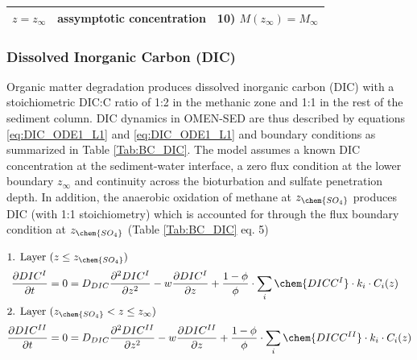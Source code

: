 \documentclass[gmd, manuscript]{copernicus}
\begin{document}
\begin{table}[tbp]
\begin{tabular}{ |l| l| l|}
$z=z_{\infty}$& assymptotic concentration & 10) $M(z_\infty)=M_\infty$\\
\hline    
\end{tabular}
\label{Tab:BC_PO4+M}
\end{table}

\subsubsection{Dissolved Inorganic Carbon (DIC)}
Organic matter degradation produces dissolved inorganic carbon (DIC) with a stoichiometric DIC:C ratio of 1:2 in the methanic zone and 1:1 in the rest of the sediment column. 
DIC dynamics in OMEN-SED are thus described by equations \ref{eq:DIC_ODE1_L1} and \ref{eq:DIC_ODE1_L1} and boundary conditions as summarized in Table \ref{Tab:BC_DIC}. 
The model assumes a known DIC concentration at the sediment-water interface, a zero flux condition at the lower boundary $z_\infty$ and continuity across the bioturbation and sulfate penetration depth. 
In addition, the anaerobic oxidation of methane at $z_{\chem{SO_4}}$ produces DIC (with 1:1 stoichiometry) which is accounted for through the flux boundary condition 
at $z_{\chem{SO_4}}$ (Table \ref{Tab:BC_DIC} eq. 5)

\begin{align}
\intertext{1. Layer ($z \leq z_{\chem{SO_4}}$)}
  \frac{\partial DIC^I}{\partial t} &= 0 = D_{DIC} \frac{\partial^2DIC^I }{\partial z^2} - w\frac{\partial DIC^I }{\partial z} + \frac{1-\phi}{\phi} \cdot \sum_i \chem{DICC^I} \cdot k_i \cdot C_{i}(z)\label{eq:DIC_ODE1_L1}\\ %
 \intertext{2. Layer ($z_{\chem{SO_4}} < z \leq z_\infty$)} 
  \frac{\partial DIC^{II}}{\partial t} &= 0 = D_{DIC} \frac{\partial^2DIC^{II} }{\partial z^2} - w\frac{\partial DIC^{II} }{\partial z} + \frac{1-\phi}{\phi} \cdot \sum_i \chem{DICC^{II}} \cdot k_i \cdot C_{i}(z)\label{eq:DIC_ODE1_L2} %
\end{align}
\end{document}
